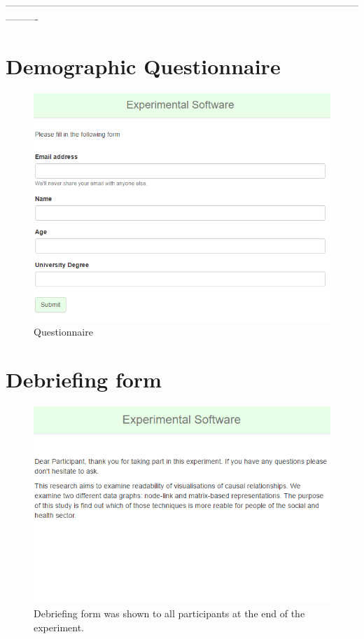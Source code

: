 \documentclass{l4proj}
\begin{document}
\begin{appendices}
----------------------------------------------------------------------------------------------------------------------
\section{Demographic Questionnaire}

\begin{figure}[H]
\centering
\includegraphics[width=14cm]{images/questionnaire.PNG}
\caption{Questionnaire}
\label{questionnaire}
\end{figure}


\section{Debriefing form}

\begin{figure}[H]
\centering
\includegraphics[width=14cm]{images/debriefing.PNG}
\caption{Debriefing form was shown to all participants at the end of the experiment.}
\label{debrief}
\end{figure}


\end{appendices}
\end{document}
